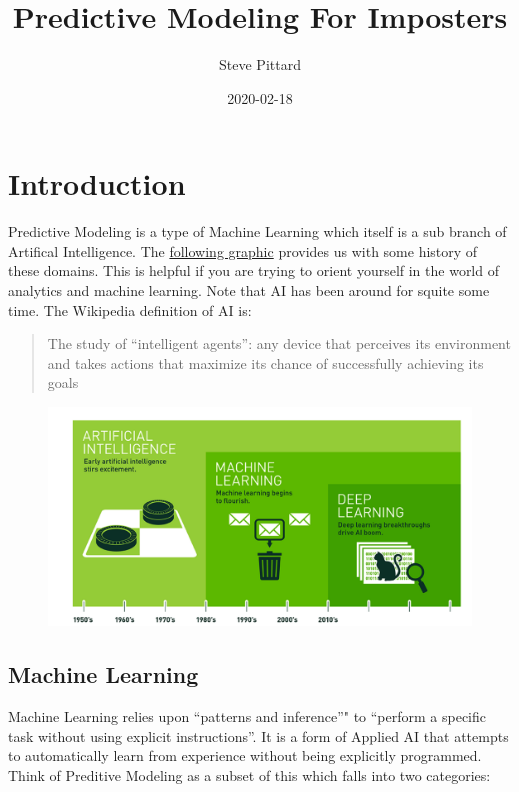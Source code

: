 \documentclass[]{book}
\title{Predictive Modeling For Imposters}
\author{Steve Pittard}
\date{2020-02-18}
\begin{document}
\maketitle

{
\setcounter{tocdepth}{1}
\tableofcontents
}
\chapter{Introduction}\label{intro}

Predictive Modeling is a type of Machine Learning which itself is a sub
branch of Artifical Intelligence. The
\href{https://blogs.nvidia.com/blog/2016/07/29/whats-difference-artificial-intelligence-machine-learning-deep-learning-ai/}{following
graphic} provides us with some history of these domains. This is helpful
if you are trying to orient yourself in the world of analytics and
machine learning. Note that AI has been around for squite some time. The
Wikipedia definition of AI is:

\begin{quote}
The study of ``intelligent agents'': any device that perceives its
environment and takes actions that maximize its chance of successfully
achieving its goals
\end{quote}

\begin{figure}
\centering
\includegraphics{./PICS/histofai.png}
\caption{}
\end{figure}

\section{Machine Learning}\label{machine-learning}

Machine Learning relies upon ``patterns and inference''" to ``perform a
specific task without using explicit instructions''. It is a form of
Applied AI that attempts to automatically learn from experience without
being explicitly programmed. Think of Preditive Modeling as a subset of
this which falls into two categories:
\end{document}
